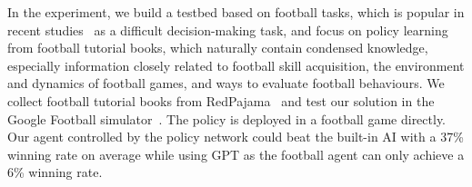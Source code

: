In the experiment, we build a testbed based on football tasks, which is popular in recent studies~\citep{football-deepmind} as a difficult decision-making task, and focus on policy learning from football tutorial books, which naturally contain condensed knowledge, especially information closely related to football skill acquisition, the environment and dynamics of football games, and ways to evaluate football behaviours. 
We collect football tutorial books from RedPajama~\citep{redpajama@2023together} and test our solution in the Google Football simulator~\citep{football2019karol}. The policy is deployed in a football game directly. Our agent controlled by the policy network could beat the built-in AI with a 37\% winning rate on average while using GPT as the football agent can only achieve a 6\% winning rate.


